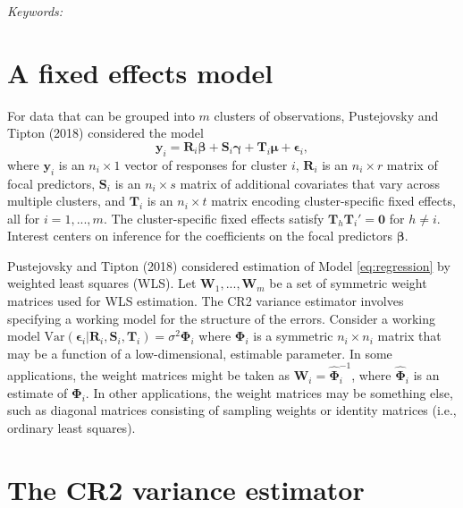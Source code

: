 \documentclass[12pt]{article}
\begin{document}
\noindent%
{\it Keywords:} 
\vfill

\newpage
{} %

\hypertarget{a-fixed-effects-model}{%
\section{A fixed effects model}\label{a-fixed-effects-model}}

For data that can be grouped into \(m\) clusters of observations,
Pustejovsky and Tipton (2018) considered the model \begin{equation}
\label{eq:regression}
\mathbf{y}_i = \mathbf{R}_i \boldsymbol\beta + \mathbf{S}_i \boldsymbol\gamma + \mathbf{T}_i \boldsymbol\mu + \boldsymbol\epsilon_i,
\end{equation} where \(\mathbf{y}_i\) is an \(n_i \times 1\) vector of
responses for cluster \(i\), \(\mathbf{R}_i\) is an \(n_i \times r\)
matrix of focal predictors, \(\mathbf{S}_i\) is an \(n_i \times s\)
matrix of additional covariates that vary across multiple clusters, and
\(\mathbf{T}_i\) is an \(n_i \times t\) matrix encoding cluster-specific
fixed effects, all for \(i = 1,...,m\). The cluster-specific fixed
effects satisfy \(\mathbf{T}_h \mathbf{T}_i' = \mathbf{0}\) for
\(h \neq i\). Interest centers on inference for the coefficients on the
focal predictors \(\boldsymbol\beta\).

Pustejovsky and Tipton (2018) considered estimation of Model
\ref{eq:regression} by weighted least squares (WLS). Let
\(\mathbf{W}_1,...,\mathbf{W}_m\) be a set of symmetric weight matrices
used for WLS estimation. The CR2 variance estimator involves specifying
a working model for the structure of the errors. Consider a working
model
\(\text{Var}\left(\boldsymbol\epsilon_i | \mathbf{R}_i, \mathbf{S}_i, \mathbf{T}_i\right) = \sigma^2 \boldsymbol\Phi_i\)
where \(\boldsymbol\Phi_i\) is a symmetric \(n_i \times n_i\) matrix
that may be a function of a low-dimensional, estimable parameter. In
some applications, the weight matrices might be taken as
\(\mathbf{W}_i = \boldsymbol{\hat\Phi}_i^{-1}\), where
\(\boldsymbol{\hat\Phi}_i\) is an estimate of \(\boldsymbol\Phi_i\). In
other applications, the weight matrices may be something else, such as
diagonal matrices consisting of sampling weights or identity matrices
(i.e., ordinary least squares).

\hypertarget{the-cr2-variance-estimator}{%
\section{The CR2 variance estimator}\label{the-cr2-variance-estimator}}
\end{document}
